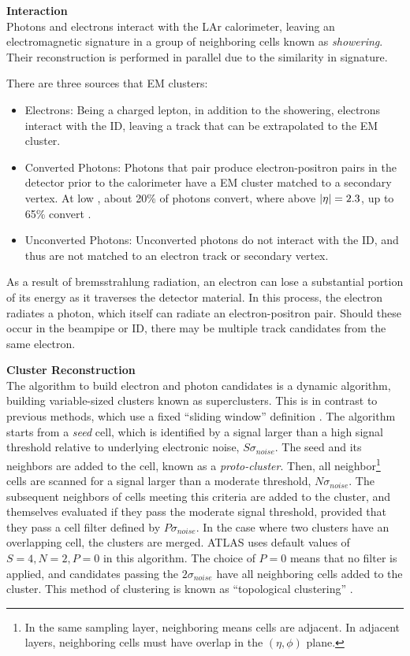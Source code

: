 \noindent\textbf{Interaction}\\
\indent Photons and electrons interact with the \gls{LAr} calorimeter, leaving an electromagnetic signature in a group of neighboring cells known as \textit{showering}. Their reconstruction is performed in parallel due to the similarity in signature.

There are three sources that \gls{EM} clusters:
\begin{itemize}
    \item Electrons: Being a charged lepton, in addition to the showering, electrons interact with the \gls{ID}, leaving a track that can be extrapolated to the \gls{EM} cluster.
    \item Converted Photons: Photons that pair produce electron-positron pairs in the detector prior to the calorimeter have a \gls{EM} cluster matched to a secondary vertex. At low \abseta, about 20\% of photons convert, where above $|\eta|=2.3$, up to 65\% convert \cite{photon-electron-perf}.
    \item Unconverted Photons: Unconverted photons do not interact with the \gls{ID}, and thus are not matched to an electron track or secondary vertex.
\end{itemize}

As a result of bremsstrahlung radiation, an electron can lose a substantial portion of its energy as it traverses the detector material. In this process, the electron radiates a photon, which itself can radiate an electron-positron pair. Should these occur in the beampipe or \gls{ID}, there may be multiple track candidates from the same electron.


\noindent\textbf{Cluster Reconstruction}\\
\indent The algorithm to build electron and photon candidates is a dynamic algorithm, building variable-sized clusters known as superclusters. This is in contrast to previous methods, which use a fixed ``sliding window'' definition \cite{sliding-window}. The algorithm starts from a \textit{seed} cell, which is identified by a signal larger than a high signal threshold relative to underlying electronic noise, $S\sigma_{noise}$. The seed and its neighbors are added to the cell, known as a \textit{proto-cluster}. Then, all neighbor\footnote{In the same sampling layer, neighboring means cells are adjacent. In adjacent layers, neighboring cells must have overlap in the $(\eta,\phi)$ plane.} cells are scanned for a signal larger than a moderate threshold, $N\sigma_{noise}$. The subsequent neighbors of cells meeting this criteria are added to the cluster, and themselves evaluated if they pass the moderate signal threshold, provided that they pass a cell filter defined by $P\sigma_{noise}$. In the case where two clusters have an overlapping cell, the clusters are merged. ATLAS uses default values of $S=4,N=2,P=0$ in this algorithm. The choice of $P=0$ means that no filter is applied, and candidates passing the $2\sigma_{noise}$ have all neighboring cells added to the cluster. This method of clustering is known as  ``topological clustering'' \cite{topo-cluster}. 





